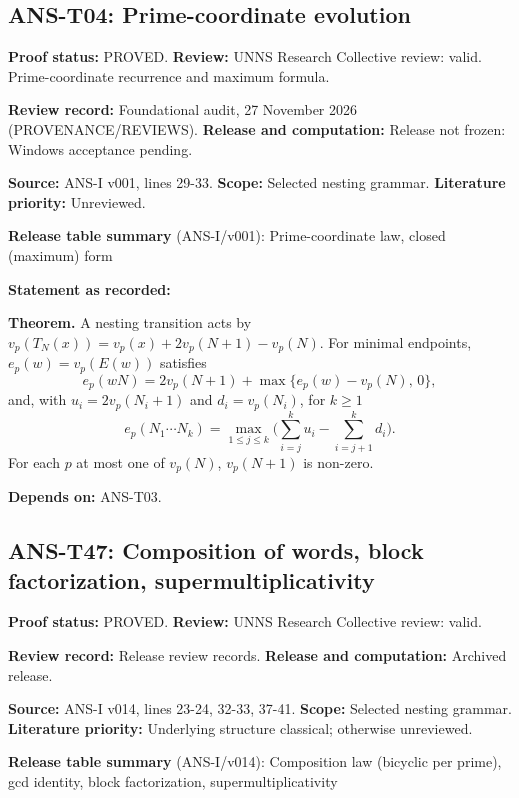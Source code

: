 \documentclass[
  11pt,
]{article}
\begin{document}
\hypertarget{ans-t04-prime-coordinate-evolution}{%
\subsection{ANS-T04: Prime-coordinate
evolution}\label{ans-t04-prime-coordinate-evolution}}

\textbf{Proof status:} PROVED. \textbf{Review:} UNNS Research Collective
review: valid. Prime-coordinate recurrence and maximum formula.

\textbf{Review record:} Foundational audit, 27 November 2026
(PROVENANCE/REVIEWS). \textbf{Release and computation:} Release not
frozen: Windows acceptance pending.

\textbf{Source:} ANS-I v001, lines 29-33. \textbf{Scope:} Selected
nesting grammar. \textbf{Literature priority:} Unreviewed.

\textbf{Release table summary} (ANS-I/v001): Prime-coordinate law,
closed (maximum) form

\textbf{Statement as recorded:}

\textbf{Theorem.} A nesting transition acts by
\(v_p(T_N(x))=v_p(x)+2v_p(N+1)-v_p(N)\). For minimal endpoints,
\(e_p(w)=v_p(E(w))\) satisfies
\[e_p(wN)=2v_p(N+1)+\max\{e_p(w)-v_p(N),\,0\},\] and, with
\(u_i=2v_p(N_i+1)\) and \(d_i=v_p(N_i)\), for \(k\ge1\)
\[e_p(N_1\cdots N_k)=\max_{1\le j\le k}\Big(\sum_{i=j}^{k}u_i-\sum_{i=j+1}^{k}d_i\Big).\]
For each \(p\) at most one of \(v_p(N)\), \(v_p(N+1)\) is non-zero.

\textbf{Depends on:} ANS-T03.

\hypertarget{ans-t47-composition-of-words-block-factorization-supermultiplicativity}{%
\subsection{ANS-T47: Composition of words, block factorization,
supermultiplicativity}\label{ans-t47-composition-of-words-block-factorization-supermultiplicativity}}

\textbf{Proof status:} PROVED. \textbf{Review:} UNNS Research Collective
review: valid.

\textbf{Review record:} Release review records. \textbf{Release and
computation:} Archived release.

\textbf{Source:} ANS-I v014, lines 23-24, 32-33, 37-41. \textbf{Scope:}
Selected nesting grammar. \textbf{Literature priority:} Underlying
structure classical; otherwise unreviewed.

\textbf{Release table summary} (ANS-I/v014): Composition law (bicyclic
per prime), gcd identity, block factorization, supermultiplicativity
\end{document}
